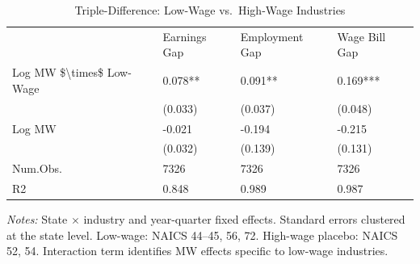\begin{table}[!htbp]
\centering
\caption{Triple-Difference: Low-Wage vs.\ High-Wage Industries}
\label{tab:ddd}
\begin{threeparttable}
\begin{tabular}{llll}
& Earnings Gap & Employment Gap & Wage Bill Gap \\
Log MW \$\textbackslash{}times\$ Low-Wage & 0.078** & 0.091** & 0.169*** \\
& (0.033) & (0.037) & (0.048) \\
Log MW & -0.021 & -0.194 & -0.215 \\
& (0.032) & (0.139) & (0.131) \\
Num.Obs. & 7326 & 7326 & 7326 \\
R2 & 0.848 & 0.989 & 0.987 \\
\end{tabular}
\begin{tablenotes}[flushleft]
\small
\item \textit{Notes:} State $\times$ industry and year-quarter fixed effects. Standard errors clustered at the state level. Low-wage: NAICS 44--45, 56, 72. High-wage placebo: NAICS 52, 54. Interaction term identifies MW effects specific to low-wage industries.
\end{tablenotes}
\end{threeparttable}
\end{table}
